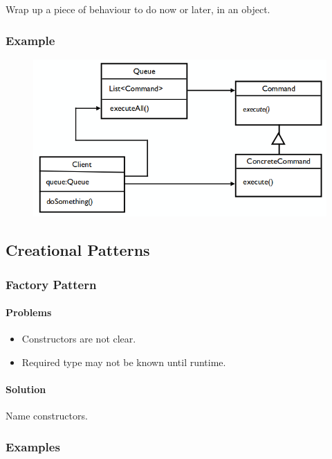 \documentclass[twocolumn,english]{article}
\begin{document}
Wrap up a piece of behaviour to do now or later, in an object.

\subsubsection*{Example}

\begin{figure}[H]
\centering{}\includegraphics[width=0.5\columnwidth]{img/command}
\end{figure}

\subsection{Creational Patterns}

\subsubsection{Factory Pattern}

\paragraph{Problems}
\begin{itemize}
\item Constructors are not clear.
\item Required type may not be known until runtime.
\end{itemize}

\paragraph{Solution}

Name constructors.

\subsubsection*{Examples}
\end{document}
